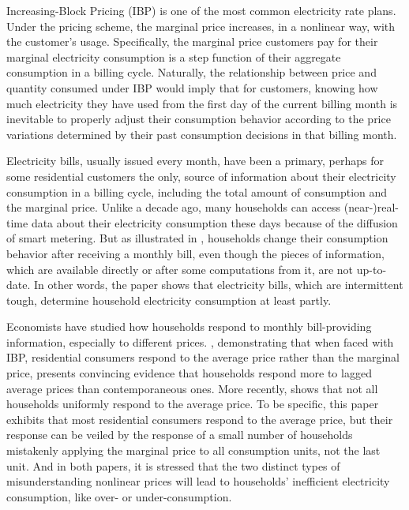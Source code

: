 Increasing-Block Pricing (IBP) is one of the most common electricity rate plans. Under the pricing scheme, the marginal price increases, in a nonlinear way, with the customer's usage. Specifically, the marginal price customers pay for their marginal electricity consumption is a step function of their aggregate consumption in a billing cycle. Naturally, the relationship between price and quantity consumed under IBP would imply that for customers, knowing how much electricity they have used from the first day of the current billing month is inevitable to properly adjust their consumption behavior according to the price variations determined by their past consumption decisions in that billing month. 

Electricity bills, usually issued every month, have been a primary, perhaps for some residential customers the only, source of information about their electricity consumption in a billing cycle, including the total amount of consumption and the marginal price. Unlike a decade ago, many households can access (near-)real-time data about their electricity consumption these days because of the diffusion of smart metering. But as illustrated in \cite{Dynamic-Salience-with-Intermittent-Billing_Gilbert-and-Zivin_2014}, households change their consumption behavior after receiving a monthly bill, even though the pieces of information, which are available directly or after some computations from it, are not up-to-date. In other words, the paper shows that electricity bills, which are intermittent tough, determine household electricity consumption at least partly. 

Economists have studied how households respond to monthly bill-providing information, especially to different prices. \cite{Do-Consumers-Respond-to-Marginal-or-Average-Price?-Evidence-from-Nonlinear-Electricity-Pricing_2014_(Ito)}, demonstrating that when faced with IBP, residential consumers respond to the average price rather than the marginal price, presents convincing evidence that households respond more to lagged average prices than contemporaneous ones. More recently, \cite{Misunderstanding-Nonlinear-Prices_2020_(Shaffer)} shows that not all households uniformly respond to the average price. To be specific, this paper exhibits that most residential consumers respond to the average price, but their response can be veiled by the response of a small number of households mistakenly applying the marginal price to all consumption units, not the last unit. And in both papers, it is stressed that the two distinct types of misunderstanding nonlinear prices will lead to households' inefficient electricity consumption, like over- or under-consumption. 

